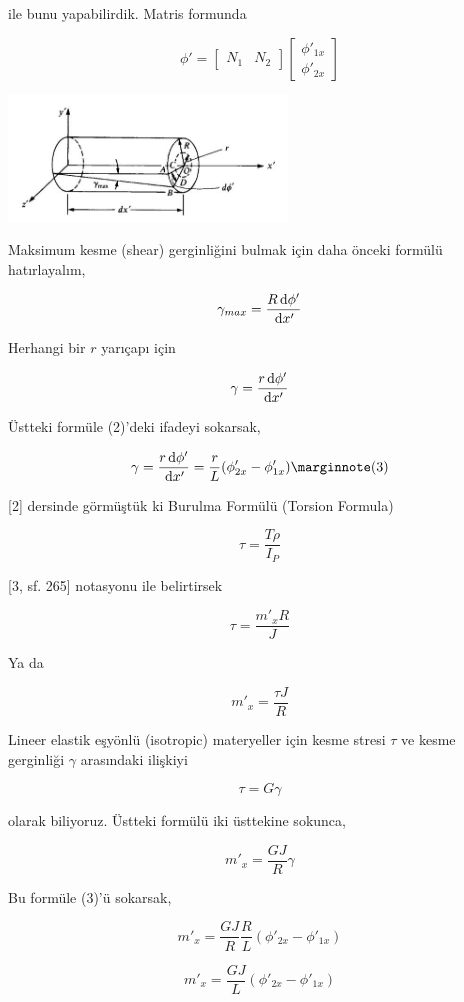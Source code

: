 \documentclass[12pt,fleqn]{article}\usepackage{../../common}
\begin{document}
ile bunu yapabilirdik. Matris formunda

$$
\phi' = [\begin{array}{cc} N_1 & N_2 \end{array}]
\left[\begin{array}{c}
\phi'_{1x} \\ \phi'_{2x}
\end{array}\right]
$$

\includegraphics[width=20em]{compscieng_bpp43fem_03.jpg}

Maksimum kesme (shear) gerginliğini bulmak için daha önceki formülü
hatırlayalım,

$$
\gamma_{max} = \frac{R \,\mathrm{d} \phi'}{\,\mathrm{d} x'}
$$

Herhangi bir $r$ yarıçapı için

$$
\gamma = \frac{r \,\mathrm{d} \phi'}{\,\mathrm{d} x'}
$$

Üstteki formüle (2)'deki ifadeyi sokarsak,

$$
\gamma =
\frac{r \ud \phi'}{\ud x'} =
\frac{r}{L} ( \phi'_{2x} - \phi'_{1x}  )
\mlabel{3}
$$

[2] dersinde görmüştük ki Burulma Formülü (Torsion Formula)

$$
\tau = \frac{T\rho}{I_P}
$$

[3, sf. 265] notasyonu ile belirtirsek 

$$
\tau = \frac{m'_x R}{J}
$$

Ya da

$$
m'_x = \frac{\tau J}{R}
$$

Lineer elastik eşyönlü (isotropic) materyeller için kesme stresi $\tau$ ve kesme
gerginliği $\gamma$ arasındaki ilişkiyi

$$
\tau = G \gamma
$$

olarak biliyoruz. Üstteki formülü iki üsttekine sokunca,

$$
m'_x = \frac{G J}{R} \gamma
$$

Bu formüle (3)'ü sokarsak, 

$$
m'_x = \frac{G J}{R} \frac{R}{L} ( \phi'_{2x} - \phi'_{1x}  )
$$

$$
m'_x = \frac{G J}{L} ( \phi'_{2x} - \phi'_{1x}  )
$$
\end{document}
